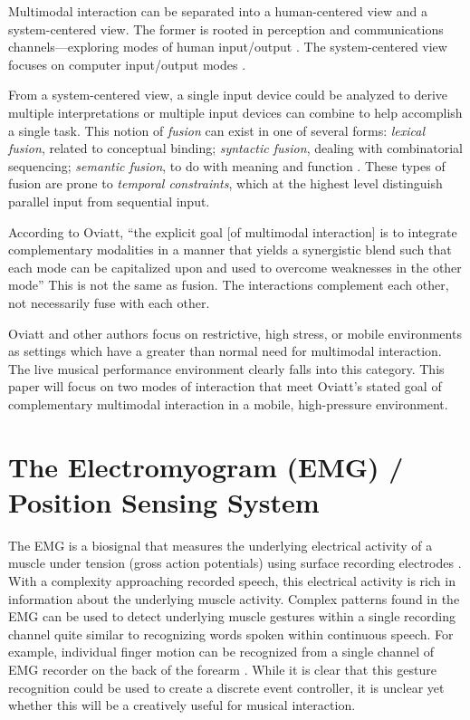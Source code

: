 Multimodal interaction can be separated into a human-centered view and a system-centered view. The former is rooted in perception and communications channels---exploring modes of human input/output \cite{Schomaker:1995}. The system-centered view focuses on computer input/output modes \cite{Raisamo:1999}. 

From a system-centered view, a single input device could be analyzed to derive multiple interpretations or multiple input devices can combine to help accomplish a single task. This notion of \textit{fusion} can exist in one of several forms: \textit{lexical fusion}, related to conceptual binding; \textit{syntactic fusion}, dealing with combinatorial sequencing; \textit{semantic fusion}, to do with meaning and function \cite{Nigay:1993}. These types of fusion are prone to \textit{temporal constraints}, which at the highest level distinguish parallel input from sequential input. 

According to Oviatt, ``the explicit goal [of multimodal interaction] is to integrate complementary modalities in a manner that yields a synergistic blend such that each mode can be capitalized upon and used to overcome weaknesses in the other mode'' \cite{Oviatt:2003} This is not the same as fusion. The interactions complement each other, not necessarily fuse with each other. 

Oviatt and other authors focus on restrictive, high stress, or mobile environments as settings which have a greater than normal need for multimodal interaction. The live musical performance environment clearly falls into this category.  This paper will focus on two modes of interaction that meet Oviatt's stated goal of complementary multimodal interaction in a mobile, high-pressure environment.



\section{The Electromyogram (EMG) / Position Sensing System}


The EMG is a biosignal that measures the underlying electrical activity of a muscle under tension (gross action potentials) using surface recording electrodes \cite{Criswell:2010}.  With a complexity approaching recorded speech, this electrical activity is rich in information about the underlying muscle activity.  Complex patterns found in the EMG can be used to detect underlying muscle gestures within a single recording channel \cite{Heinz:1996} quite similar to recognizing words spoken within continuous speech.  For example, individual finger motion can be recognized from a single channel of EMG recorder on the back of the forearm \cite{Putnam:1993}. While it is clear that this gesture recognition could be used to create a discrete event controller, it is unclear yet whether this will be a creatively useful for musical interaction.   


